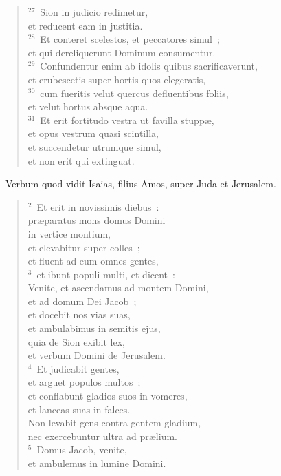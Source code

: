 \begin{flushleft}
\begin{verse}
${}^{27}$~Sion in judicio redimetur,\\ et reducent eam in justitia.\\
${}^{28}$~Et conteret scelestos, et peccatores simul~;\\ et qui dereliquerunt Dominum consumentur.\\
${}^{29}$~Confundentur enim ab idolis quibus sacrificaverunt,\\ et erubescetis super hortis quos elegeratis,\\
${}^{30}$~cum fueritis velut quercus defluentibus foliis,\\ et velut hortus absque aqua.\\
${}^{31}$~Et erit fortitudo vestra ut favilla stupp\ae ,\\ et opus vestrum quasi scintilla,\\ et succendetur utrumque simul,\\ et non erit qui extinguat.\end{verse}\end{flushleft}


~\lettrine[lines=10,image=true,loversize=0.05,lraise=-0.03]{V}{}erbum quod vidit Isaias, filius Amos, super Juda et Jerusalem.
\begin{flushleft}\begin{verse}\vspace{6pt}${}^{2}$~Et erit in novissimis diebus~:\\ pr\ae paratus mons domus Domini\\ in vertice montium,\\ et elevabitur super colles~;\\ et fluent ad eum omnes gentes,\\
${}^{3}$~et ibunt populi multi, et dicent~:\\ Venite, et ascendamus ad montem Domini,\\ et ad domum Dei Jacob~;\\ et docebit nos vias suas,\\ et ambulabimus in semitis ejus,\\ quia de Sion exibit lex,\\ et verbum Domini de Jerusalem.\\
${}^{4}$~Et judicabit gentes,\\ et arguet populos multos~;\\ et conflabunt gladios suos in vomeres,\\ et lanceas suas in falces.\\ Non levabit gens contra gentem gladium,\\ nec exercebuntur ultra ad pr\ae lium.\\
${}^{5}$~Domus Jacob, venite,\\ et ambulemus in lumine Domini.\end{verse}\end{flushleft}


